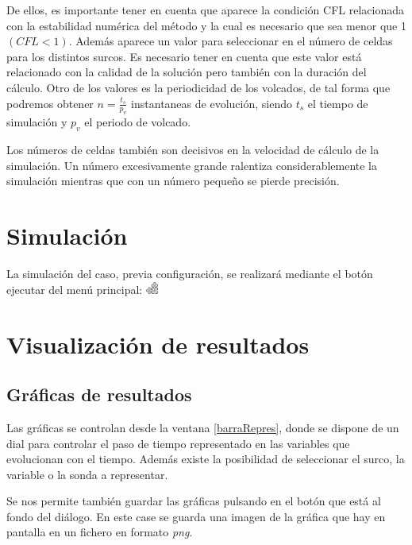 De ellos, es importante tener en cuenta que aparece la condición CFL relacionada con la estabilidad numérica del método y la cual es necesario que sea menor que 1 $(CFL < 1)$. Además aparece un valor para seleccionar en el número de celdas para los distintos surcos. Es necesario tener en cuenta que este valor está relacionado con la calidad de la solución pero también con la duración del cálculo. Otro de los valores es la periodicidad de los volcados, de tal forma que podremos obtener $ n=\frac{t_s}{p_v}$ instantaneas de evolución, siendo $ t_s $ el tiempo de simulación y $ p_v $ el periodo de volcado. 

Los números de celdas también son decisivos en la velocidad de cálculo de la simulación. Un número excesivamente grande ralentiza considerablemente la simulación mientras que con un número pequeño se pierde precisión. 

\section{Simulación}

La simulación del caso, previa configuración, se realizará mediante el botón ejecutar del menú principal:
\includegraphics[height=0.4cm]{images/gtk-execute.png}

\section{Visualización de resultados}


\subsection{Gráficas de resultados}

Las gráficas se controlan desde la ventana \ref{barraRepres}, donde se dispone de un dial para controlar el paso de tiempo representado en las variables que evolucionan con el tiempo. Además existe la posibilidad de seleccionar el surco, la variable o la sonda a representar. 

Se nos permite también guardar las gráficas pulsando en el botón que está al fondo del diálogo. En este case se guarda una imagen de la gráfica que hay en pantalla en un fichero en formato \emph{png}.

